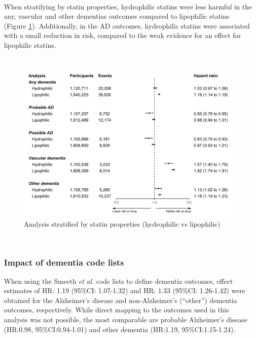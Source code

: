 \documentclass[a4paper, twoside]{templates/ociamthesis}
\begin{document}
~

When stratifying by statin properties, hydrophilic statins were less harmful in the any, vascular and other dementias outcomes compared to lipophilic statins (Figure \ref{fig:statinTypeFig}). Additionally, in the AD outcomes, hydrophilic statins were associated with a small reduction in risk, compared to the weak evidence for an effect for lipophilic statins.

~





\begin{figure}[H]
\includegraphics[width=1\linewidth]{figures/cprd-analysis/forester_sta_type} \caption[Analysis stratified by statin properties]{Analysis stratified by statin properties (hydrophilic vs lipophilic)}\label{fig:statinTypeFig}
\end{figure}

~

\hypertarget{comparing-codelists}{%
\subsubsection{Impact of dementia code lists}\label{comparing-codelists}}

When using the Smeeth \emph{et al.} code lists to define dementia outcomes, effect estimates of HR: 1.19 (95\%CI: 1.07-1.32) and HR: 1.33 (95\%CI: 1.26-1.42) were obtained for the Alzheimer's disease and non-Alzheimer's (``other'') dementia outcomes, respectively. While direct mapping to the outcomes used in this analysis was not possible, the most comparable are probable Alzheimer's disease (HR:0.98, 95\%CI:0.94-1.01) and other dementia (HR:1.19, 95\%CI:1.15-1.24).
\end{document}
